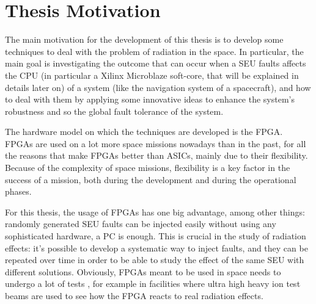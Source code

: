 \section{Thesis Motivation}
The main motivation for the development of this thesis is to develop some techniques to deal with the problem of radiation in the space. In particular, the main goal is investigating the outcome that can occur when a SEU faults affects the CPU (in particular a Xilinx Microblaze soft-core, that will be explained in details later on) of a system (like the navigation system of a spacecraft), and how to deal with them by applying some innovative ideas to enhance the system's robustness and so the global fault tolerance of the system. \bigskip

The hardware model on which the techniques are developed is the FPGA. FPGAs are used on a lot more space missions nowadays than in the past, for all the reasons that make FPGAs better than ASICs, mainly due to their flexibility. Because of the complexity of space missions, flexibility is a key factor in the success of a mission, both during the development and during the operational phases. \bigskip

For this thesis, the usage of FPGAs has one big advantage, among other things: randomly generated SEU faults can be injected easily without using any sophisticated \cite{9459804} hardware, a PC is enough. This is crucial in the study of radiation effects: it's possible to develop a systematic way to inject faults, and they can be repeated over time in order to be able to study the effect of the same SEU with different solutions. Obviously, FPGAs meant to be used in space needs to undergo a lot of tests \cite{8708253}, for example in facilities where ultra high heavy ion test beams are used to see how the FPGA reacts to real radiation effects.